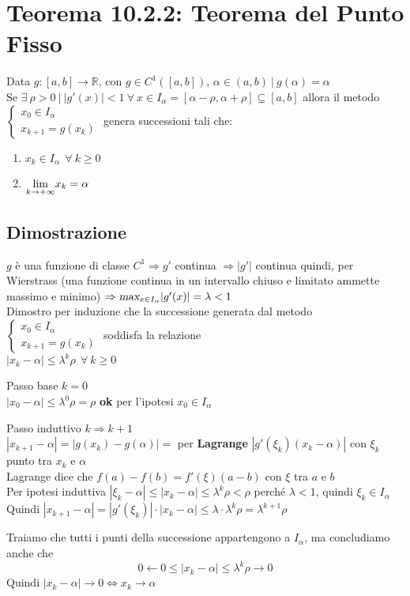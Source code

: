 \documentclass[10pt]{book}
\begin{document}
\section{Teorema 10.2.2: Teorema del Punto Fisso} Data $g : [a, b] \rightarrow\mathbb{R}$, con $g \in C^1([a, b])$, $\alpha \in (a, b)\:|\:g(\alpha) = \alpha$\\
Se $\exists\:\rho>0\:|\:|g'(x)|<1\:\forall\:x\in I_\alpha = [\alpha - \rho, \alpha + \rho]\subseteq[a, b]$  allora il metodo $\left\{\begin{array}{l}
x_0 \in I_\alpha\\
x_{k+1} = g(x_k)
\end{array}\right.$ genera successioni tali che:
\begin{enumerate}
	\item $x_k \in I_\alpha\:\:\forall\:k\geq 0$
	\item $\mathlarger{\lim_{k\to+\infty}}x_k = \alpha$
\end{enumerate}
\subsection{Dimostrazione} $g$ è una funzione di classe $C^1 \Rightarrow g'$ continua $\Rightarrow |g'|$ continua quindi, per Wierstrass (una funzione continua in un intervallo chiuso e limitato ammette massimo e minimo) $\Rightarrow \mathlarger{\textsl{max}_{x\in I_\alpha}}|g'(x)| = \lambda < 1$\\
Dimostro per induzione che la successione generata dal metodo $\left\{\begin{array}{l}
x_0 \in I_\alpha\\
x_{k+1} = g(x_k)
\end{array}\right.$ soddisfa la relazione\\$|x_k - \alpha| \leq \lambda^k\rho\:\:\forall\:k\geq 0$
\begin{list}{}{}
	\item Passo base $k = 0$\\
	$|x_0 - \alpha| \leq \lambda^0\rho = \rho$ \textbf{ok} per l'ipotesi $x_0 \in I_\alpha$
	\item Passo induttivo $k \Rightarrow k+1$\\
	$|x_{k+1} - \alpha| = |g(x_k) - g(\alpha)| =$ per \textbf{Lagrange} $|g'(\xi_k)(x_k - \alpha)|$ con $\xi_k$ punto tra $x_k$ e $\alpha$\\
	Lagrange dice che $f(a) - f(b) = f'(\xi)(a - b)$ con $\xi$ tra $a$ e $b$\\
	Per ipotesi induttiva $|\xi_k - \alpha| \leq |x_k - \alpha| \leq \lambda^k\rho < \rho$ perché $\lambda < 1$, quindi $\xi_k \in I_\alpha$\\
	Quindi $|x_{k+1} - \alpha| = |g'(\xi_k)|\cdot|x_k - \alpha| \leq \lambda\cdot\lambda^k\rho = \lambda^{k+1}\rho$
\end{list}
Traiamo che tutti i punti della successione appartengono a $I_\alpha$, ma concludiamo anche che $$0 \longleftarrow 0 \leq |x_k - \alpha| \leq \lambda^k\rho \longrightarrow 0$$
Quindi $|x_k - \alpha| \rightarrow 0 \Leftrightarrow x_k \rightarrow \alpha$
\end{document}
